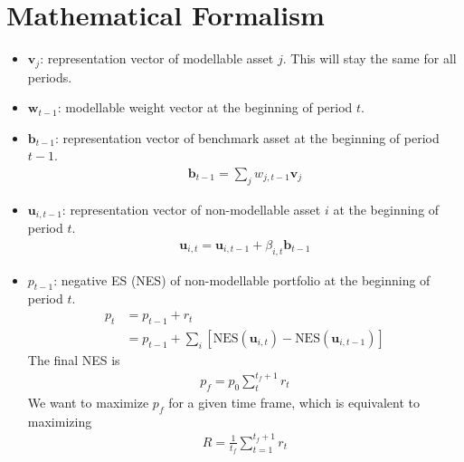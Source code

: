 \documentclass[14pt, letterpaper]{extarticle}
\theoremstyle{definition}
\numberwithin{thm}{subsection}
\numberwithin{mydef}{subsection}
\numberwithin{eg}{subsection}
\newcommand*{\mb}[1]{\mathbf{#1}}
\begin{document}
\section{Mathematical Formalism}

\begin{itemize}
\item $ \mb{v}_{j} $: representation vector of modellable asset $ j $. This will stay the same for all periods.
\item $ \mb{w}_{t-1} $: modellable weight vector at the beginning of period $ t $.
\item $ \mb{b}_{t-1} $: representation vector of benchmark asset at the beginning of period $ t-1 $.
\begin{align*}
\mb{b}_{t-1} = \sum_j w_{j,t-1} \mb{v}_j
\end{align*}
\item $ \mb{u}_{i,t-1} $: representation vector of non-modellable asset $ i $ at the beginning of period $ t $.
\begin{align*}
\mb{u}_{i,t} = \mb{u}_{i,t-1} + \beta_{i,t}\mb{b}_{t-1}
\end{align*}
\item $ p_{t-1} $: negative ES (NES) of non-modellable portfolio at the beginning of period $ t $.
\begin{align*}
p_t 
&= p_{t-1} + r_t \\
&= p_{t-1} + \sum_i \left[\text{NES}\left( \mb{u}_{i,t} \right) - \text{NES}\left(\mb{u}_{i,t-1}\right)\right]
\end{align*}
The final NES is
\begin{align*}
p_f = p_0 \sum_t^{t_f+1} r_t 
\end{align*}
We want to maximize $ p_f $ for a given time frame, which is equivalent to maximizing
\begin{align*}
R = \frac{1}{t_f} \sum_{t=1}^{t_f+1} r_t
\end{align*}
\end{itemize}
\end{document}
